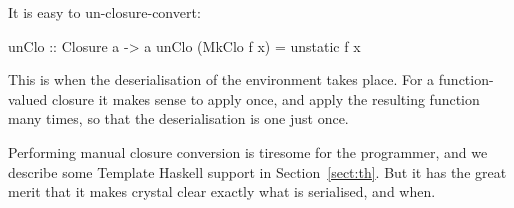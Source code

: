 \documentclass[preprint]{sigplanconf}
\begin{document}
It is easy to un-closure-convert:
\begin{code}
  unClo :: Closure a -> a
  unClo (MkClo f x) = unstatic f x
\end{code}
This is when the deserialisation of the environment takes place. For a
function-valued closure it makes sense to apply  once, and
apply the resulting function many times, so that the deserialisation is
one just once.

Performing manual closure conversion is tiresome for the programmer,
and we describe some Template Haskell support in
Section~\ref{sect:th}.  But it has the great merit that it makes
crystal clear exactly what is serialised, and when.  

% 
% 
% 
% 
% 
% 
% 
\end{document}

